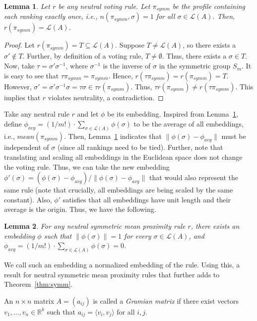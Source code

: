 \documentclass[10pt,letterpaper]{article}
\newcommand{\calL}{{\mathcal{L}}}
\newcommand{\rank}{{\calL(A)}}
\newtheorem{lemma}{Lemma}
\newenvironment{definition}[1][Definition]{\begin{trivlist}
\item[\hskip \labelsep {\bfseries #1}]}{\end{trivlist}}
\begin{document}
\begin{lemma}
Let $r$ be any neutral voting rule. Let $\pi_{symm}$ be the profile containing each ranking exactly once, i.e., $n(\pi_{symm},\sigma) = 1$ for all $\sigma \in \rank$. Then, $r(\pi_{symm}) = \rank$. 
\label{lem:average-profile}
\end{lemma}
\begin{proof}
Let $r(\pi_{symm}) = T \subseteq \rank$. Suppose $T \neq \rank$, so there exists a $\sigma' \notin T$. Further, by definition of a voting rule, $T \neq \emptyset$. Thus, there exists a $\sigma \in T$. Now, take $\tau = \sigma' \sigma^{-1}$, where $\sigma^{-1}$ is the inverse of $\sigma$ in the symmetric group $S_m$. It is easy to see that $\tau \pi_{symm} = \pi_{symm}$. Hence, $r(\tau \pi_{symm}) = r(\pi_{symm}) = T$. However, $\sigma' = \sigma' \sigma^{-1} \sigma = \tau \sigma \in \tau r(\pi_{symm})$. Thus, $\tau r(\pi_{symm}) \neq r(\tau \pi_{symm})$. This implies that $r$ violates neutrality, a contradiction. 
\end{proof}

Take any neutral rule $r$ and let $\phi$ be its embedding. Inspired from Lemma~\ref{lem:average-profile}, define $\phi_{avg} = (1/{m!}) \cdot \sum_{\sigma \in \rank} \phi(\sigma)$ to be the average of all embeddings, i.e., $mean(\pi_{symm})$. Then, Lemma~\ref{lem:average-profile} indicates that $\|\phi(\sigma)-\phi_{avg}\|$ must be independent of $\sigma$ (since all rankings need to be tied). Further, note that translating and scaling all embeddings in the Euclidean space does not change the voting rule. Thus, we can take the new embedding $\phi'(\sigma) = (\phi(\sigma)-\phi_{avg})/\|\phi(\sigma)-\phi_{avg}\|$ that would also represent the same rule (note that crucially, all embeddings are being scaled by the same constant). Also, $\phi'$ satisfies that all embeddings have unit length and their average is the origin. Thus, we have the following.

\begin{lemma}
For any neutral symmetric mean proximity rule $r$, there exists an embedding $\phi$ such that $\|\phi(\sigma)\| = 1$ for every $\sigma \in \rank$, and $\phi_{avg} = (1/{m!}) \cdot \sum_{\sigma \in \rank} \phi(\sigma) = 0$.
\label{lem:normalized-embedding}
\end{lemma}

We call such an embedding a normalized embedding of the rule. Using this, a result for neutral symmetric mean proximity rules that further adds to Theorem~\ref{thm:symm}. 
\begin{definition}[Gramian Matrix]
An $n \times n$ matrix $A = (a_{ij})$ is called a \emph{Gramian matrix} if there exist vectors $v_1,\ldots,v_n \in \mathbb{R}^k$ such that $a_{ij} = \langle v_i,v_j \rangle$ for all $i,j$. 
\end{definition}
\end{document}

